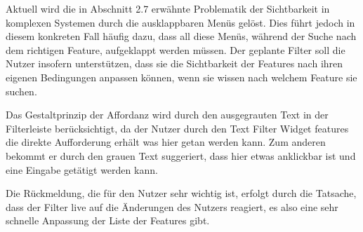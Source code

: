 Aktuell wird die in Abschnitt 2.7 erwähnte Problematik der Sichtbarkeit in komplexen Systemen durch die ausklappbaren Menüs gelöst.
Dies führt jedoch in diesem konkreten Fall häufig dazu, dass all diese Menüs, während der Suche nach dem richtigen Feature, aufgeklappt werden müssen.
Der geplante Filter soll die Nutzer insofern unterstützen, dass sie die Sichtbarkeit der Features nach ihren eigenen Bedingungen anpassen können, wenn sie wissen nach welchem Feature sie suchen.

Das Gestaltprinzip der Affordanz wird durch den ausgegrauten Text in der Filterleiste berücksichtigt, da der Nutzer durch den Text \glqq Filter Widget features\grqq{} die direkte Aufforderung erhält was hier getan werden kann.
Zum anderen bekommt er durch den grauen Text suggeriert, dass hier etwas anklickbar ist und eine Eingabe getätigt werden kann.

Die Rückmeldung, die für den Nutzer sehr wichtig ist, erfolgt durch die Tatsache, dass der Filter live auf die Änderungen des Nutzers reagiert, es also eine sehr schnelle Anpassung der Liste der Features gibt.

